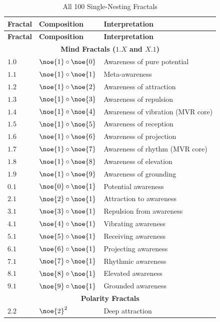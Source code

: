 \begin{longtable}{lll}
\caption{All 100 Single-Nesting Fractals} \\
\toprule
\textbf{Fractal} & \textbf{Composition} & \textbf{Interpretation} \\
\midrule
\endfirsthead
\toprule
\textbf{Fractal} & \textbf{Composition} & \textbf{Interpretation} \\
\midrule
\endhead
\multicolumn{3}{c}{\textbf{Mind Fractals ($1.X$ and $X.1$)}} \\
\midrule
$1.0$ & $\noe{1} \circ \noe{0}$ & Awareness of pure potential \\
$1.1$ & $\noe{1} \circ \noe{1}$ & Meta-awareness \\
$1.2$ & $\noe{1} \circ \noe{2}$ & Awareness of attraction \\
$1.3$ & $\noe{1} \circ \noe{3}$ & Awareness of repulsion \\
$1.4$ & $\noe{1} \circ \noe{4}$ & Awareness of vibration (MVR core) \\
$1.5$ & $\noe{1} \circ \noe{5}$ & Awareness of reception \\
$1.6$ & $\noe{1} \circ \noe{6}$ & Awareness of projection \\
$1.7$ & $\noe{1} \circ \noe{7}$ & Awareness of rhythm (MVR core) \\
$1.8$ & $\noe{1} \circ \noe{8}$ & Awareness of elevation \\
$1.9$ & $\noe{1} \circ \noe{9}$ & Awareness of grounding \\
\midrule
$0.1$ & $\noe{0} \circ \noe{1}$ & Potential awareness \\
$2.1$ & $\noe{2} \circ \noe{1}$ & Attraction to awareness \\
$3.1$ & $\noe{3} \circ \noe{1}$ & Repulsion from awareness \\
$4.1$ & $\noe{4} \circ \noe{1}$ & Vibrating awareness \\
$5.1$ & $\noe{5} \circ \noe{1}$ & Receiving awareness \\
$6.1$ & $\noe{6} \circ \noe{1}$ & Projecting awareness \\
$7.1$ & $\noe{7} \circ \noe{1}$ & Rhythmic awareness \\
$8.1$ & $\noe{8} \circ \noe{1}$ & Elevated awareness \\
$9.1$ & $\noe{9} \circ \noe{1}$ & Grounded awareness \\
\midrule
\multicolumn{3}{c}{\textbf{Polarity Fractals}} \\
\midrule
$2.2$ & $\noe{2}^2$ & Deep attraction \\

\end{longtable}
